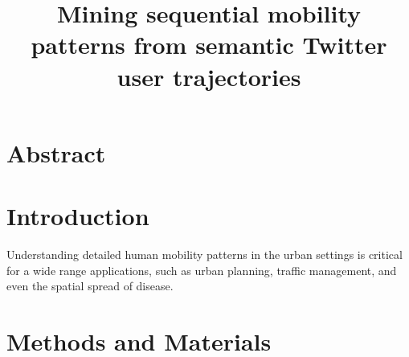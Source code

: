\documentclass[a4paper,11pt]{article}
\begin{document}
\title{Mining sequential mobility patterns from semantic Twitter user trajectories}
\maketitle

\section*{Abstract}

\section*{Introduction}
Understanding detailed human mobility patterns in the urban settings is critical for a wide range applications, such as urban planning, traffic management, and even the spatial spread of disease.



\section*{Methods and Materials}
\end{document}
